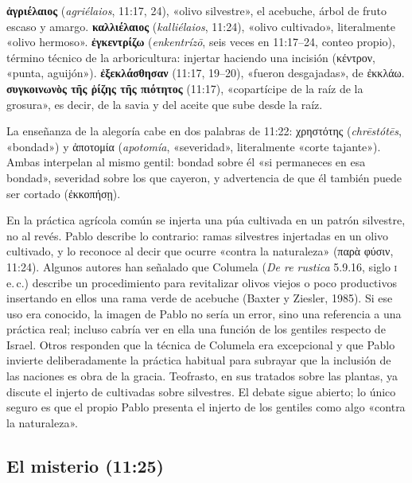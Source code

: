 \documentclass[11pt,letterpaper]{article}
\newcommand{\grc}[1]{\foreignlanguage{ancientgreek}{#1}}
\begin{document}
\textbf{\grc{ἀγριέλαιος}} (\emph{agriélaios}, 11:17, 24), «olivo silvestre», el acebuche, árbol de fruto escaso y amargo. \textbf{\grc{καλλιέλαιος}} (\emph{kalliélaios}, 11:24), «olivo cultivado», literalmente «olivo hermoso». \textbf{\grc{ἐγκεντρίζω}} (\emph{enkentrízō}, seis veces en 11:17--24, conteo propio), término técnico de la arboricultura: injertar haciendo una incisión (\grc{κέντρον}, «punta, aguijón»). \textbf{\grc{ἐξεκλάσθησαν}} (11:17, 19--20), «fueron desgajadas», de \grc{ἐκκλάω}. \textbf{\grc{συγκοινωνὸς τῆς ῥίζης τῆς πιότητος}} (11:17), «copartícipe de la raíz de la grosura», es decir, de la savia y del aceite que sube desde la raíz.

La enseñanza de la alegoría cabe en dos palabras de 11:22: \grc{χρηστότης} (\emph{chrēstótēs}, «bondad») y \grc{ἀποτομία} (\emph{apotomía}, «severidad», literalmente «corte tajante»). Ambas interpelan al mismo gentil: bondad sobre él «si permaneces en esa bondad», severidad sobre los que cayeron, y advertencia de que él también puede ser cortado (\grc{ἐκκοπήσῃ}).

\begin{nota}
En la práctica agrícola común se injerta una púa cultivada en un patrón silvestre, no al revés. Pablo describe lo contrario: ramas silvestres injertadas en un olivo cultivado, y lo reconoce al decir que ocurre «contra la naturaleza» (\grc{παρὰ φύσιν}, 11:24). Algunos autores han señalado que Columela (\emph{De re rustica} 5.9.16, siglo \textsc{i} e.\,c.) describe un procedimiento para revitalizar olivos viejos o poco productivos insertando en ellos una rama verde de acebuche (Baxter y Ziesler, 1985). Si ese uso era conocido, la imagen de Pablo no sería un error, sino una referencia a una práctica real; incluso cabría ver en ella una función de los gentiles respecto de Israel. Otros responden que la técnica de Columela era excepcional y que Pablo invierte deliberadamente la práctica habitual para subrayar que la inclusión de las naciones es obra de la gracia. Teofrasto, en sus tratados sobre las plantas, ya discute el injerto de cultivadas sobre silvestres. El debate sigue abierto; lo único seguro es que el propio Pablo presenta el injerto de los gentiles como algo «contra la naturaleza».
\end{nota}

\subsection{El misterio (11:25)}
\end{document}
